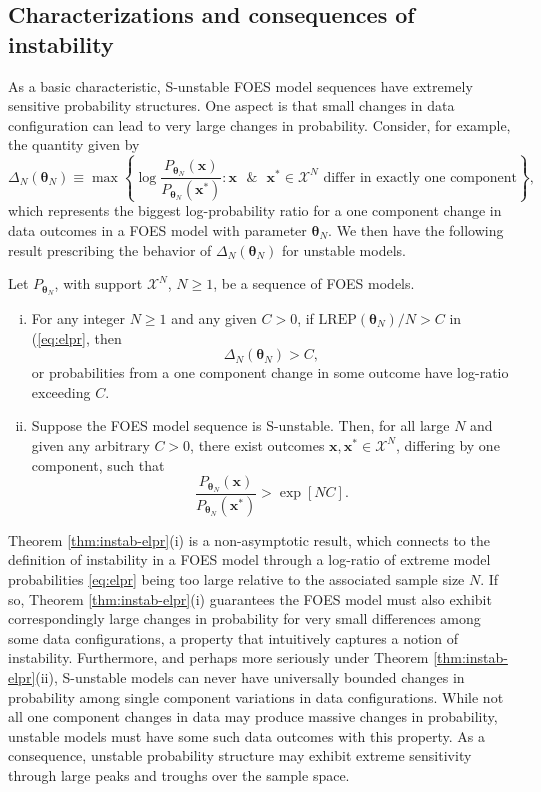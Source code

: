 \documentclass[12pt]{article}
\theoremstyle{definition}
\newcommand{\REP}{\mathrm{LREP}}
\newcommand{\DN}{\Delta_N}
\let\BeginKnitrBlock\begin \let\EndKnitrBlock\end
\begin{document}
\subsection{Characterizations and consequences of
instability}\label{characterizations-and-consequences-of-instability}

As a basic characteristic, S-unstable FOES model sequences have
extremely sensitive probability structures. One aspect is that small
changes in data configuration can lead to very large changes in
probability. Consider, for example, the quantity given by \[
\DN(\boldsymbol \theta_N) \equiv \max \left\{\log \frac{P_{\boldsymbol \theta_N}(\boldsymbol x)}{P_{\boldsymbol \theta_N}(\boldsymbol x^*)} : \boldsymbol x \text{ }\& \text{ } \boldsymbol x^* \in \mathcal{X}^N \text{ differ in exactly one component}\right\},
\] which represents the biggest log-probability ratio for a one
component change in data outcomes in a FOES model with parameter
\(\boldsymbol \theta_N\). We then have the following result prescribing
the behavior of \(\DN(\boldsymbol \theta_N)\) for unstable models.

\BeginKnitrBlock{theorem}
\protect\hypertarget{thm:instab-elpr}{}{\label{thm:instab-elpr}}Let
\(P_{\boldsymbol \theta_N}\), with support \(\mathcal{X}^N\),
\(N\geq 1\), be a sequence of FOES models.
\begin{enumerate}[(i)]
\item For any integer $N \geq 1$ and any given $C>0$, if $\REP(\boldsymbol \theta_N)/N > C$ in (\ref{eq:elpr}, then
    $$ \DN(\boldsymbol \theta_N) > C,$$
    or probabilities from a one component change in some outcome have log-ratio exceeding $C$.
\item Suppose the FOES model sequence is S-unstable. Then, for all large $N$ and given any arbitrary $C>0$, there exist outcomes $\boldsymbol x,\boldsymbol x^*\in\mathcal{X}^N$, differing by one component, such that
    $$
    \frac{P_{\boldsymbol \theta_N}(\boldsymbol x)}{P_{\boldsymbol \theta_N}(\boldsymbol x^*)} > \exp[N C].
    $$
\end{enumerate}
\EndKnitrBlock{theorem}

Theorem \ref{thm:instab-elpr}(i) is a non-asymptotic result, which
connects to the definition of instability in a FOES model through a
log-ratio of extreme model probabilities \eqref{eq:elpr} being too large
relative to the associated sample size \(N\). If so, Theorem
\ref{thm:instab-elpr}(i) guarantees the FOES model must also exhibit
correspondingly large changes in probability for very small differences
among some data configurations, a property that intuitively captures a
notion of instability. Furthermore, and perhaps more seriously under
Theorem \ref{thm:instab-elpr}(ii), S-unstable models can never have
universally bounded changes in probability among single component
variations in data configurations. While not all one component changes
in data may produce massive changes in probability, unstable models must
have some such data outcomes with this property. As a consequence,
unstable probability structure may exhibit extreme sensitivity through
large peaks and troughs over the sample space.
\end{document}

